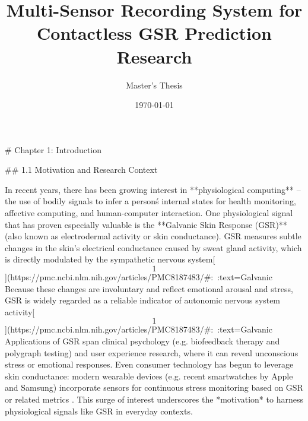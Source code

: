\documentclass[12pt,a4paper]{article}
\title{Multi-Sensor Recording System for Contactless GSR Prediction Research}
\author{Master's Thesis}
\date{\today}
\begin{document}
\maketitle
\newpage

\tableofcontents
\newpage

# Chapter 1: Introduction

## 1.1 Motivation and Research Context

In recent years, there has been growing interest in **physiological
computing** -- the use of bodily signals to infer a person\'s internal
states for health monitoring, affective computing, and human-computer
interaction. One physiological signal that has proven especially
valuable is the **Galvanic Skin Response (GSR)** (also known as
electrodermal activity or skin conductance). GSR measures subtle changes
in the skin's electrical conductance caused by sweat gland activity,
which is directly modulated by the sympathetic nervous
system[\[1\]](https://pmc.ncbi.nlm.nih.gov/articles/PMC8187483/#:~:text=Galvanic%
Because these changes are involuntary and reflect emotional arousal and
stress, GSR is widely regarded as a reliable indicator of autonomic
nervous system
activity[\[1\]](https://pmc.ncbi.nlm.nih.gov/articles/PMC8187483/#:~:text=Galvanic%
Applications of GSR span clinical psychology (e.g. biofeedback therapy
and polygraph testing) and user experience research, where it can reveal
unconscious stress or emotional responses. Even consumer technology has
begun to leverage skin conductance: modern wearable devices (e.g. recent
smartwatches by Apple and Samsung) incorporate sensors for continuous
stress monitoring based on GSR or related
metrics \citep{AppliedSciences2020AffectiveComputing, PMC2021GSRStress}.
This surge of interest underscores the *motivation* to harness
physiological signals like GSR in everyday contexts.
\end{document}
